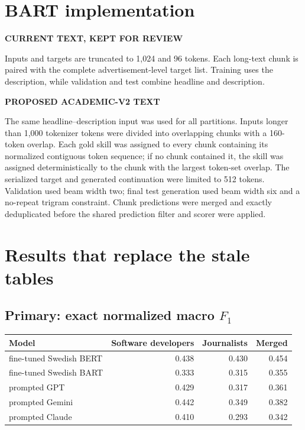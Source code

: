 \documentclass[11pt,a4paper]{article}
\newenvironment{OldBlock}
  {\definecolor{shadecolor}{RGB}{255,230,230}\begin{shaded}\begingroup\textbf{CURRENT TEXT, KEPT FOR REVIEW}\par\color{red!70!black}}
  {\endgroup\end{shaded}}
\newenvironment{NewBlock}
  {\definecolor{shadecolor}{RGB}{199,235,255}\begin{shaded}\begingroup\textbf{PROPOSED ACADEMIC-V2 TEXT}\par\color{newink}}
  {\endgroup\end{shaded}}
\begin{document}
\section{BART implementation}
\begin{OldBlock}
Inputs and targets are truncated to 1,024 and 96 tokens. Each long-text chunk
is paired with the complete advertisement-level target list. Training uses the
description, while validation and test combine headline and description.
\end{OldBlock}
\begin{NewBlock}
The same headline--description input was used for all partitions. Inputs longer
than 1,000 tokenizer tokens were divided into overlapping chunks with a
160-token overlap. Each gold skill was assigned to every chunk containing its
normalized contiguous token sequence; if no chunk contained it, the skill was
assigned deterministically to the chunk with the largest token-set overlap.
The serialized target and generated continuation were limited to 512 tokens.
Validation used beam width two; final test generation used beam width six and
a no-repeat trigram constraint. Chunk predictions were merged and exactly
deduplicated before the shared prediction filter and scorer were applied.
\end{NewBlock}

\section{Results that replace the stale tables}
\subsection*{Primary: exact normalized macro $F_1$}
\begin{center}
\begin{tabular}{lrrr}
\toprule
Model & Software developers & Journalists & Merged \\
\midrule
fine-tuned Swedish BERT & 0.438 & 0.430 & 0.454 \\
fine-tuned Swedish BART & 0.333 & 0.315 & 0.355 \\
prompted GPT & 0.429 & 0.317 & 0.361 \\
prompted Gemini & 0.442 & 0.349 & 0.382 \\
prompted Claude & 0.410 & 0.293 & 0.342 \\
\bottomrule
\end{tabular}
\end{center}
\end{document}

